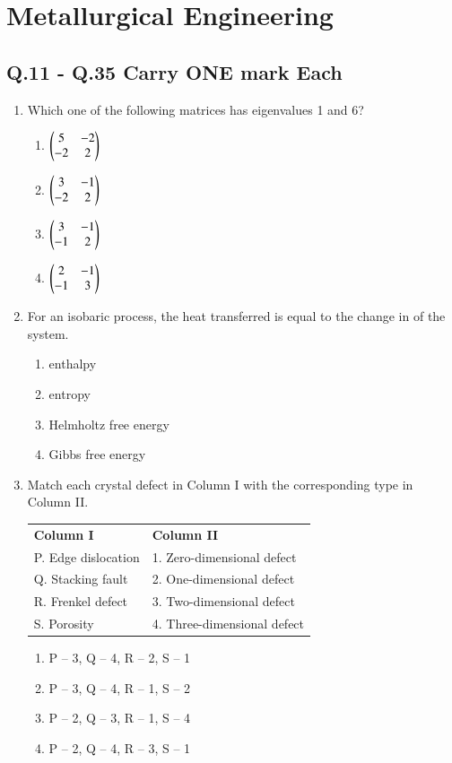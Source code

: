 \documentclass[journal]{IEEEtran}
\theoremstyle{remark}
\begin{document}
\section*{Metallurgical Engineering}
\subsection*{Q.11 - Q.35 Carry ONE mark Each}
\begin{enumerate}[resume]
\item Which one of the following matrices has eigenvalues 1 and 6? \hfill{}
\begin{multicols}{2}
\begin{enumerate}
\item $\begin{pmatrix}5 & -2 \\ -2 & 2\end{pmatrix}$
\item $\begin{pmatrix}3 & -1 \\ -2 & 2 \end{pmatrix}$
\item $\begin{pmatrix}3 & -1 \\ -1 & 2\end{pmatrix}$
\item $\begin{pmatrix}2 & -1 \\ -1 & 3\end{pmatrix}$
\end{enumerate}
\end{multicols}

\item For an isobaric process, the heat transferred is equal to the change in \underline{\hspace{2cm}} of the system. \hfill{}
\begin{multicols}{2}
\begin{enumerate}
\item enthalpy
\item entropy
\item Helmholtz free energy
\item Gibbs free energy
\end{enumerate}
\end{multicols}

\item Match each crystal defect in Column I with the corresponding type in Column II. \hfill{}
\begin{center}
\begin{tabular}{ll}
\textbf{Column I} & \textbf{Column II} \\
P. Edge dislocation & 1. Zero-dimensional defect \\
Q. Stacking fault & 2. One-dimensional defect \\
R. Frenkel defect & 3. Two-dimensional defect \\
S. Porosity & 4. Three-dimensional defect \\
\end{tabular}
\end{center}
\begin{enumerate}
\item P – 3, Q – 4, R – 2, S – 1  
\item P – 3, Q – 4, R – 1, S – 2  
\item P – 2, Q – 3, R – 1, S – 4
\item P – 2, Q – 4, R – 3, S – 1
\end{enumerate}


\end{enumerate}
\end{document}
